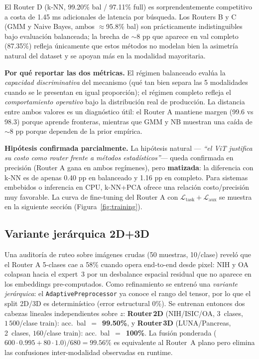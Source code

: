 \documentclass[11pt, a4paper]{article}
\begin{document}
El Router D (k-NN, 99.20\% bal / 97.11\% full) es sorprendentemente
competitivo a costa de 1.45 ms adicionales de latencia por búsqueda. Los
Routers B y C (GMM y Naive Bayes, ambos $\approx$95.8\% bal) son
prácticamente indistinguibles bajo evaluación balanceada; la brecha de
$\sim$8 pp que aparece en val completo (87.35\%) refleja únicamente que
estos métodos no modelan bien la asimetría natural del dataset y se
apoyan más en la modalidad mayoritaria.

\textbf{Por qué reportar las dos métricas.} El régimen balanceado evalúa
la \textit{capacidad discriminativa} del mecanismo (qué tan bien separa
las 5 modalidades cuando se le presentan en igual proporción); el régimen
completo refleja el \textit{comportamiento operativo} bajo la distribución
real de producción. La distancia entre ambos valores es un diagnóstico
útil: el Router A mantiene margen (99.6 vs 98.3) porque aprende fronteras,
mientras que GMM y NB muestran una caída de $\sim$8 pp porque dependen
de la prior empírica.

\textbf{Hipótesis confirmada parcialmente.} La hipótesis natural —
\textit{``el ViT justifica su costo como router frente a métodos
estadísticos''}— queda confirmada en precisión (Router A gana en ambos
regímenes), pero \textbf{matizada}: la diferencia con k-NN es de apenas
0.40 pp en balanceado y 1.16 pp en completo. Para sistemas embebidos o
inferencia en CPU, k-NN+PCA ofrece una relación costo/precisión muy
favorable. La curva de fine-tuning del Router A con
$\mathcal{L}_{\text{task}}+\mathcal{L}_{\text{aux}}$ se muestra en la
siguiente sección (Figura~\ref{fig:training}).

\subsection{Variante jerárquica 2D+3D}

Una auditoría de ruteo sobre imágenes crudas (50 muestras, 10/clase) reveló
que el Router A 5-clases cae a 58\% cuando opera end-to-end desde pixel:
NIH y OA colapsan hacia el expert~3 por un desbalance espacial residual que
no aparece en los embeddings pre-computados. Como refinamiento se entrenó
una \textit{variante jerárquica}: el \texttt{AdaptivePreprocessor} ya conoce
el rango del tensor, por lo que el split 2D/3D es determinístico (error
estructural 0\%). Se entrenan entonces dos cabezas lineales independientes
sobre $z$: \textbf{Router\,2D} (NIH/ISIC/OA, 3~clases, $1\,500$/clase train):
acc.~bal~$=$~\textbf{99.50\%}, y \textbf{Router\,3D} (LUNA/Pancreas,
2~clases, $160$/clase train): acc.~bal~$=$~\textbf{100\%}. La fusión
ponderada ($600 \cdot 0.995 + 80 \cdot 1.0)/680 = 99.56\%$ es equivalente
al Router~A plano pero elimina las confusiones inter-modalidad observadas
en runtime.
\end{document}
